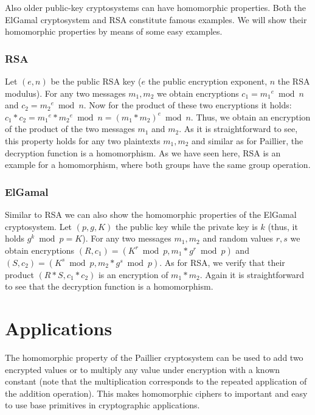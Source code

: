 \begin{bibunit}[babalpha]
Also older public-key cryptosystems can have homomorphic properties. Both the ElGamal cryptosystem and RSA constitute famous examples. We will show their homomorphic properties by means of some easy examples.

\subsubsection{RSA}

Let $(e,n)$ be the public RSA key ($e$ the public encryption exponent, $n$ the RSA modulus). For any two messages $m_1, m_2$ we obtain encryptions $c_1 = {m_1}^e \bmod n$ and $c_2 = {m_2}^e \bmod n$. Now for the product of these two encryptions it holds: $c_1*c_2={m_1}^e * {m_2}^e \bmod n=(m_1*m_2)^e \bmod n$. Thus, we obtain an encryption of the product of the two messages $m_1$ and $m_2$. As it is straightforward to see, this property holds for any two plaintexts $m_1, m_2$ and similar as for Paillier, the decryption function is a homomorphism. As we have seen here, RSA is an example for a homomorphism, where both groups have the same group operation.

\subsubsection{ElGamal}

Similar to RSA we can also show the homomorphic properties of the ElGamal cryptosystem. Let $(p,g,K)$ the public key while the private key is $k$ (thus, it holds $g^k \bmod p = K$). For any two messages $m_1, m_2$ and random values $r, s$ we obtain encryptions $(R, c_1) = (K^r \bmod p, m_1*g^r \bmod p)$ and $(S,c_2) = (K^s \bmod p, m_2 * g^s \bmod p)$. As for RSA, we verify that their product $(R*S, c_1*c_2)$ is an encryption of $m_1*m_2$. Again it is straightforward to see that the decryption function is a homomorphism.

\section{Applications}
The homomorphic property of the Paillier cryptosystem can be used to add two encrypted values or to multiply any value under encryption with a known constant (note that the multiplication corresponds to the repeated application of the addition operation). This makes homomorphic ciphers to important and easy to use base primitives in cryptographic applications.


\end{bibunit}
